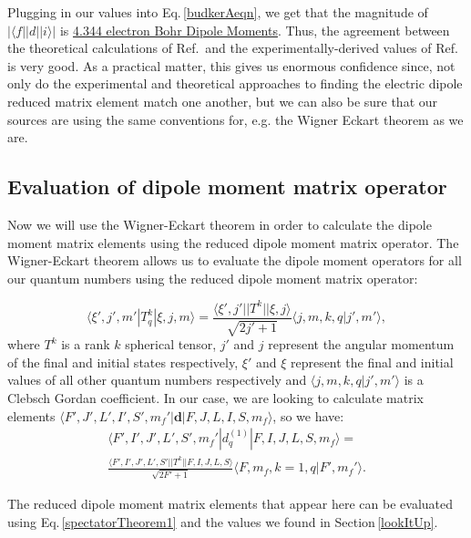 Plugging in our values into Eq.\,\ref{budkerAeqn}, we get that the magnitude of $|\langle f ||d|| i \rangle|$ is \href{http://www.wolframalpha.com/input/?i=sqrt%283*hbar*c%5E3%2F%284*%282*pi*c%2F407.771+nm%29%5E3%29*4*pi*epsilon_0*4*1.41e8*1%2Fs%29}{4.344 electron Bohr Dipole Moments}.
Thus, the agreement between the theoretical calculations of Ref.\,\cite{safronova2photon} and the experimentally-derived values of Ref.\,\cite{NISTasd} is very good. As a practical matter, this gives us enormous confidence since, not only do the experimental and theoretical approaches to finding the electric dipole reduced matrix element match one another, but we can also be sure that our sources are using the same conventions for, e.g. the Wigner Eckart theorem as we are.

\subsection{Evaluation of dipole moment matrix operator}

Now we will use the Wigner-Eckart theorem in order to calculate the dipole moment matrix elements using the reduced dipole moment matrix operator. The Wigner-Eckart theorem allows us to evaluate the dipole moment operators for all our quantum numbers using the reduced dipole moment matrix operator:

\begin{equation}\label{wignerEckart}
\langle \xi',j',m'|T^k_q|\xi,j,m\rangle = \frac{\langle \xi',j'||T^k||\xi,j\rangle}{\sqrt{2j'+1}}\langle j,m,k,q|j',m'\rangle,
\end{equation}
where $T^k$ is a rank $k$ spherical tensor, $j'$ and $j$ represent the angular momentum of the final and initial states respectively, $\xi'$ and $\xi$ represent the final and initial values of all other quantum numbers respectively and $\langle j,m,k,q|j',m'\rangle$ is a Clebsch Gordan coefficient. In our case, we are looking to calculate matrix elements  $\langle F',J',L',I',S',m_f'|\mathbf{d}|F,J,L,I,S,m_f\rangle$, so we have:
\begin{multline}\label{wignerEckartForUs}
\langle F',I',J',L',S',m_f'|d^{(1)}_q|F,I,J,L,S,m_f\rangle =
\\ \frac{\langle F',I',J',L',S'||T^k||F,I,J,L,S\rangle}{\sqrt{2F'+1}}\langle F,m_f,k=1,q|F',m_f'\rangle.
\end{multline}

The reduced dipole moment matrix elements that appear here can be evaluated using Eq.\,\ref{spectatorTheorem1} and the values we found in Section\,\ref{lookItUp}. 

